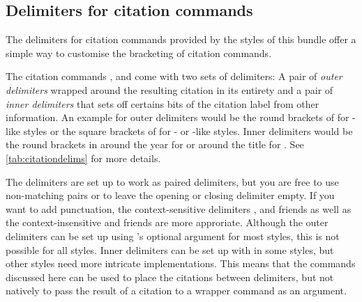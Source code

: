 \documentclass[DIV=9]{scrartcl}
\newcommand*{\highlightbf}[2][1]{\textcolor{highlight#1}{\textbf{#2}}}
\begin{document}
\begin{bibexample}
\renewcommand*{\extradateonlycompcitedelim}{\highlightbf{\addcomma}}
\cite{knuth:ct:b,knuth:ct:c}
\end{bibexample}


\subsection{Delimiters for citation commands}\label{sec:opt:citedelims}
The delimiters for citation commands provided by the styles of this bundle
offer a simple way to customise the bracketing of citation commands.

The citation commands ,  and  come with
two sets of delimiters: A pair of \emph{outer delimiters} wrapped around the
resulting citation in its entirety and a pair of \emph{inner delimiters} that
sets off certains bits of the citation label from other information.
An example for outer delimiters would be the round brackets of 
for -like styles or the square brackets of  for
- or -like styles.
Inner delimiters would be the round brackets in  around
the year for  or around the title for .
See \cref{tab:citationdelims} for more details.

The delimiters are set up to work as paired delimiters, but you are free to
use non-matching pairs or to leave the opening or closing delimiter empty.
If you want to add punctuation, the context-sensitive delimiters
,  and friends as well as
the context-insensitive  and friends are more approriate.
Although the outer delimiters can be set up using 's
optional  argument for most styles, this is not possible for all
styles. Inner delimiters can be set up with  in some
styles, but other styles need more intricate implementations.
This means that the commands discussed here can be used to place the citations
between delimiters, but not natively to pass the result of a citation to a
wrapper command as an argument.
\end{document}
